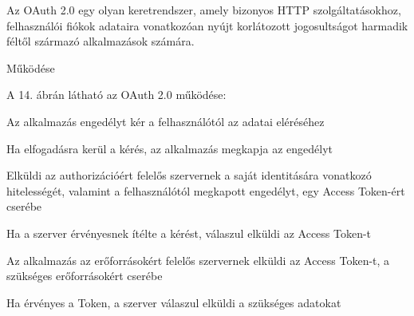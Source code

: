 Az OAuth 2.0 egy olyan keretrendszer, amely bizonyos HTTP szolgáltatásokhoz, felhasználói fiókok adataira vonatkozóan nyújt korlátozott jogosultságot harmadik féltől származó alkalmazások számára. 

Működése 

A 14. ábrán látható az OAuth 2.0 működése: 

Az alkalmazás engedélyt kér a felhasználótól az adatai eléréséhez 

Ha elfogadásra kerül a kérés, az alkalmazás megkapja az engedélyt 

Elküldi az authorizációért felelős szervernek a saját identitására vonatkozó hitelességét, valamint a felhasználótól megkapott engedélyt, egy Access Token-ért cserébe 

Ha a szerver érvényesnek ítélte a kérést, válaszul elküldi az Access Token-t 

Az alkalmazás az erőforrásokért felelős szervernek elküldi az Access Token-t, a szükséges erőforrásokért cserébe 

Ha érvényes a Token, a szerver válaszul elküldi a szükséges adatokat 